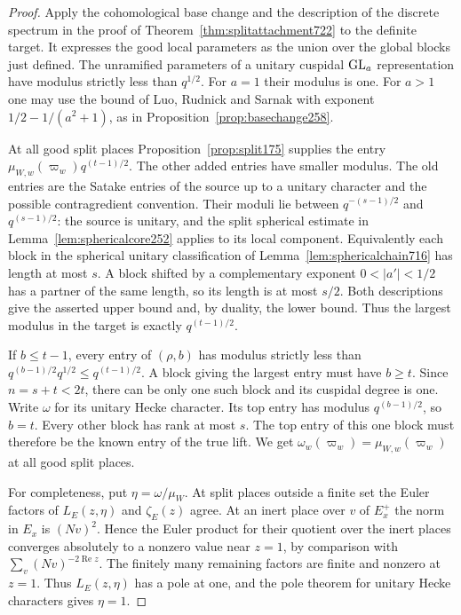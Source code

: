 \documentclass[a4paper,11pt]{article}
\theoremstyle{definition}
\theoremstyle{remark}
\numberwithin{equation}{section}
\begin{document}
\begin{proof}
Apply the cohomological base change and the description
of the discrete spectrum in the proof of
Theorem~\ref{thm:splitattachment722} to the definite
target. It expresses the good local parameters as
the union over the global blocks just defined. The
unramified parameters of a unitary cuspidal
\({\rm GL}_a\) representation have modulus strictly
less than \(q^{1/2}\). For \(a=1\) their modulus is
one. For \(a>1\) one may use the bound of Luo,
Rudnick and Sarnak with exponent
\(1/2-1/(a^2+1)\), as in
Proposition~\ref{prop:basechange258}.~\cite{X-VII-lrs787}

At all good split places Proposition~\ref{prop:split175}
supplies the entry \(\mu_{W,w}(\varpi_w)q^{(t-1)/2}\).
The other added entries have smaller modulus. The
old entries are the Satake entries of the source
up to a unitary character and the possible
contragredient convention. Their moduli lie between
\(q^{-(s-1)/2}\) and \(q^{(s-1)/2}\): the source is
unitary, and the split spherical estimate in
Lemma~\ref{lem:sphericalcore252} applies to its local
component. Equivalently each block in the spherical
unitary classification of Lemma~\ref{lem:sphericalchain716}
has length at most \(s\). A block shifted by a
complementary exponent \(0<|a'|<1/2\) has a partner
of the same length, so its length is at most \(s/2\).
Both descriptions give the asserted upper bound and,
by duality, the lower bound. Thus the largest modulus
in the target is exactly \(q^{(t-1)/2}\).

If \(b\le t-1\), every entry of \((\rho,b)\) has
modulus strictly less than
\(q^{(b-1)/2}q^{1/2}\le q^{(t-1)/2}\).
A block giving the largest entry must have \(b\ge t\).
Since \(n=s+t<2t\), there can be only one such
block and its cuspidal degree is one. Write
\(\omega\) for its unitary Hecke character. Its top
entry has modulus \(q^{(b-1)/2}\), so \(b=t\).
Every other block has rank at most \(s\). The top
entry of this one block must therefore be the known
entry of the true lift. We get
\(\omega_w(\varpi_w)=\mu_{W,w}(\varpi_w)\) at
all good split places.

For completeness, put \(\eta=\omega/\mu_W\). At
split places outside a finite set the Euler factors
of \(L_E(z,\eta)\) and \(\zeta_E(z)\) agree. At an
inert place over \(v\) of \(E_x^+\) the norm in \(E_x\)
is \((Nv)^2\). Hence the Euler product for their
quotient over the inert places converges absolutely
to a nonzero value near \(z=1\), by comparison with
\(\sum_v(Nv)^{-2\operatorname{Re}z}\). The finitely
many remaining factors are finite and nonzero at
\(z=1\). Thus \(L_E(z,\eta)\) has a pole at one,
and the pole theorem for unitary Hecke characters
gives \(\eta=1\).


\end{proof}
\end{document}
